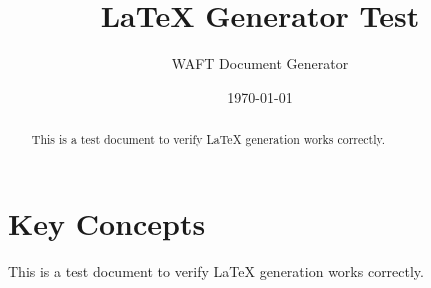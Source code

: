 \documentclass[11pt,letterpaper]{article}
\title{LaTeX Generator Test}
\author{WAFT Document Generator}
\date{\today}
\begin{document}
\maketitle

\begin{abstract}
This is a test document to verify LaTeX generation works correctly.
\end{abstract}

\section{Key Concepts}
This is a test document to verify LaTeX generation works correctly.
\end{document}
